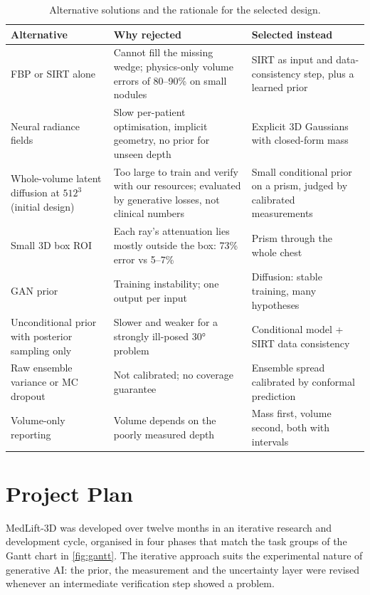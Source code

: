 \begin{table}[!htbp]
\centering\small
\caption{Alternative solutions and the rationale for the selected design.}
\label{tab:alternatives}
\begin{tabularx}{\linewidth}{>{\raggedright\arraybackslash}p{3.4cm} >{\raggedright\arraybackslash}X >{\raggedright\arraybackslash}p{3.6cm}}
\toprule
Alternative & Why rejected & Selected instead \\
\midrule
FBP or SIRT alone & Cannot fill the missing wedge; physics-only volume errors of 80--90\% on small nodules & SIRT as input and data-consistency step, plus a learned prior \\
Neural radiance fields~\cite{mildenhall2020nerf} & Slow per-patient optimisation, implicit geometry, no prior for unseen depth & Explicit 3D Gaussians with closed-form mass \\
Whole-volume latent diffusion at $512^3$ (initial design) & Too large to train and verify with our resources; evaluated by generative losses, not clinical numbers & Small conditional prior on a prism, judged by calibrated measurements \\
Small 3D box ROI & Each ray's attenuation lies mostly outside the box: 73\% error vs 5--7\% & Prism through the whole chest \\
GAN prior & Training instability; one output per input & Diffusion: stable training, many hypotheses \\
Unconditional prior with posterior sampling only & Slower and weaker for a strongly ill-posed \ang{30} problem & Conditional model + SIRT data consistency \\
Raw ensemble variance or MC dropout & Not calibrated; no coverage guarantee & Ensemble spread calibrated by conformal prediction \\
Volume-only reporting & Volume depends on the poorly measured depth & Mass first, volume second, both with intervals \\
\bottomrule
\end{tabularx}
\end{table}

\section{Project Plan}

MedLift-3D was developed over twelve months in an iterative research and development cycle, organised in four phases that match the task groups of the Gantt chart in \cref{fig:gantt}. The iterative approach suits the experimental nature of generative AI: the prior, the measurement and the uncertainty layer were revised whenever an intermediate verification step showed a problem.

